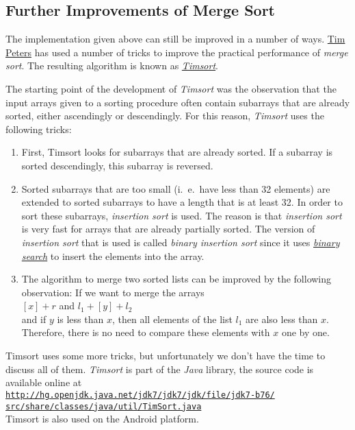 \subsection{Further Improvements of Merge Sort}
The implementation given above can still be improved in a number of ways.  
\href{http://c2.com/cgi/wiki?TimPeters}{Tim Peters} has used a number of tricks to improve the
practical performance of \emph{merge sort}.  The resulting algorithm is known as
\href{http://en.wikipedia.org/wiki/Timsort}{\emph{Timsort}}.

The starting point of the development of \emph{Timsort} was the observation that the input arrays 
given to a sorting procedure often contain subarrays that are already sorted, either ascendingly or
descendingly.   For this reason, \emph{Timsort} uses the following tricks:
\begin{enumerate}
\item First, Timsort looks for subarrays that are already sorted.
      If a subarray is sorted descendingly, this subarray is reversed.
\item Sorted subarrays that are too small (i.~e.~have less than 32 elements) are extended
      to sorted subarrays to have a length that is at least 32.  In order to sort these subarrays,
      \emph{insertion sort} is used.  The reason is that \emph{insertion sort} is very fast for
      arrays that are already partially sorted.  The version of \emph{insertion sort} that is used is called
      \emph{binary insertion sort} since it uses 
      \href{http://en.wikipedia.org/wiki/Binary_search}{\emph{binary search}} to insert the elements
      into the array.
\item The algorithm to merge two sorted lists can be improved by the following observation: If we
      want to merge the arrays
      \\[0.2cm]
      \hspace*{1.3cm}
      $[x] + r$ \quad and \quad $l_1 + [y] + l_2$
      \\[0.2cm]
      and if $y$ is less than $x$, then all elements of the list $l_1$ are also less than $x$.
      Therefore, there is no need to compare these elements with $x$ one by one.  
\end{enumerate}
Timsort uses some more tricks, but unfortunately we don't have the time to discuss all of them.
\emph{Timsort} is part of the \textsl{Java} library, the source code is available online at
\\[0.2cm]
\hspace*{1.3cm}
\href{http://hg.openjdk.java.net/jdk7/jdk7/jdk/file/jdk7-b76/src/share/classes/java/util/TimSort.java}{\texttt{http://hg.openjdk.java.net/jdk7/jdk7/jdk/file/jdk7-b76/\\
\hspace*{2.5cm}
    src/share/classes/java/util/TimSort.java}}
\\[0.2cm]
Timsort is also used on the Android platform.

